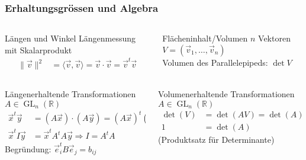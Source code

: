 %
%
%
\bgroup
\begin{frame}[t]
\setlength{\abovedisplayskip}{5pt}
\setlength{\belowdisplayskip}{5pt}
\frametitle{Erhaltungsgrössen und Algebra}
\vspace{-20pt}
\begin{columns}[t,onlytextwidth]
\begin{column}{0.48\textwidth}
\begin{block}{Längen und Winkel}
Längenmessung mit Skalarprodukt
\begin{align*}
\|\vec{v}\|^2
&=
\langle \vec{v},\vec{v}\rangle
=
\vec{v}\cdot \vec{v}
=
\vec{v}^t\vec{v}
\end{align*}
\end{block}
\end{column}
\begin{column}{0.48\textwidth}
\begin{block}{Flächeninhalt/Volumen}
$n$ Vektoren $V=(\vec{v}_1,\dots,\vec{v}_n)$
\\
Volumen des Parallelepipeds: $\det V$
\end{block}
\end{column}
\end{columns}
%
\vspace{-7pt}
\begin{columns}[t,onlytextwidth]
\begin{column}{0.48\textwidth}
\begin{block}{Längenerhaltende Transformationen}
$A\in\operatorname{GL}_n(\mathbb{R})$
\begin{align*}
\vec{x}^t\vec{y}
&=
(A\vec{x})
\cdot
(A\vec{y})
=
(A\vec{x})^t
(A\vec{y})
\\
\vec{x}^tI\vec{y}
&=
\vec{x}^tA^tA\vec{y}
\Rightarrow I=A^tA
\end{align*}
Begründung: $\vec{e}_i^t B \vec{e}_j = b_{ij}$
\end{block}
\end{column}
\begin{column}{0.48\textwidth}
\begin{block}{Volumenerhaltende Transformationen}
$A\in\operatorname{GL}_n(\mathbb{R})$
\begin{align*}
\det(V)
&=
\det(AV)
=
\det(A)\det(V)
\\
1&=\det(A)
\end{align*}
(Produktsatz für Determinante)
\end{block}
\end{column}

\end{columns}
\end{frame}

